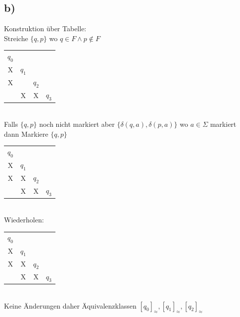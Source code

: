 \subsection*{b)}
Konstruktion über Tabelle:\\
Streiche $\{q,p\}$ wo $q \in F \wedge p \not \in F$ \\
\begin{tabular}{c | c | c | c }
$q_0$ \\
X& $q_1$ \\
X&& $q_2$ \\
&X&X& $q_3$ \\
\end{tabular}\\
Falls $\{q,p\}$ noch nicht markiert aber $\{\delta(q,a), \delta(p,a)\}$ wo $a \in \Sigma$ markiert dann Markiere $\{q,p\}$ \\
\begin{tabular}{c | c | c | c }
$q_0$ \\
X& $q_1$ \\
X&X& $q_2$ \\
&X&X& $q_3$ \\
\end{tabular}\\
Wiederholen:\\
\begin{tabular}{c | c | c | c }
$q_0$ \\
X& $q_1$ \\
X&X& $q_2$ \\
&X&X& $q_3$ \\
\end{tabular}\\
Keine Änderungen daher Äquivalenzklassen $[q_0]_{\approx},[q_1]_{\approx},[q_2]_{\approx} $

